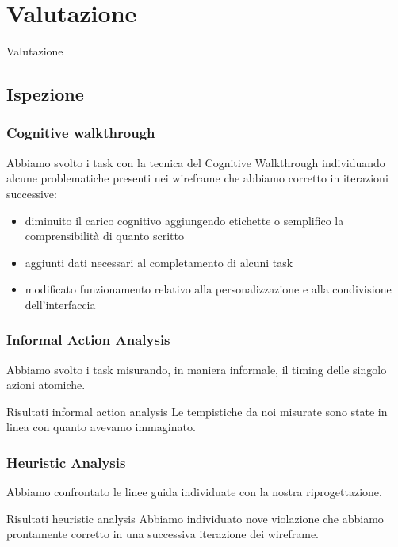 \documentclass[handout]{beamer}
\begin{document}
	\section{Valutazione}
		\begin{frame}
			\centering
			\begin{Huge}
				Valutazione
			\end{Huge}
		\end{frame}
		\subsection{Ispezione}
		\begin{frame}
			\frametitle{Cognitive walkthrough}
			Abbiamo svolto i task con la tecnica del Cognitive Walkthrough individuando alcune problematiche presenti nei wireframe che abbiamo corretto in iterazioni successive:
			\begin{itemize}[<+->]
				\item diminuito il carico cognitivo aggiungendo etichette o semplifico la comprensibilità di quanto scritto\\
				\item aggiunti dati necessari al completamento di alcuni task\\
				\item modificato funzionamento relativo alla personalizzazione e alla condivisione dell'interfaccia\\
			\end{itemize}
		\end{frame}

		\begin{frame}
			\frametitle{Informal Action Analysis}
			Abbiamo svolto i task misurando, in maniera informale, il timing delle singolo azioni atomiche. \newline \newline
			\begin{block}{Risultati informal action analysis}
			Le tempistiche da noi misurate sono state in linea con quanto avevamo immaginato.
		\end{block}
		\end{frame}

		\begin{frame}
			\frametitle{Heuristic Analysis}
			Abbiamo confrontato le linee guida individuate con la nostra riprogettazione. \newline \newline
			\begin{block}{Risultati heuristic analysis}
				Abbiamo individuato nove violazione che abbiamo prontamente corretto in una successiva iterazione dei wireframe.
		\end{block}
		\end{frame}
\end{document}
